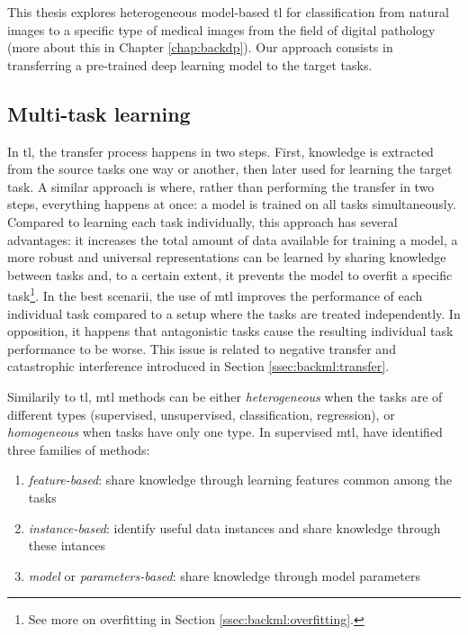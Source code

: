 This thesis explores heterogeneous model-based \acrlong{tl} for classification from natural images to a specific type of medical images from the field of digital pathology (more about this in Chapter \ref{chap:backdp}). Our approach consists in transferring a pre-trained deep learning model to the target tasks. 


\subsection{Multi-task learning}
\label{ssec:backml:mtl}

In \acrlong{tl}, the transfer process happens in two steps. First, knowledge is extracted from the source tasks one way or another, then later used for learning the target task. A similar approach is  where, rather than performing the transfer in two steps, everything happens at once: a model is trained on all tasks simultaneously. Compared to learning each task individually, this approach has several advantages: it increases the total amount of data available for training a model, a more robust and universal representations can be learned by sharing knowledge between tasks and, to a certain extent, it prevents the model to overfit a specific task\footnote{See more on overfitting in Section \ref{ssec:backml:overfitting}.}. In the best scenarii, the use of \acrlong{mtl} improves the performance of each individual task compared to a setup where the tasks are treated independently. In opposition, it happens that antagonistic tasks cause the resulting individual task performance to be worse. This issue is related to negative transfer and catastrophic interference introduced in Section \ref{ssec:backml:transfer}. 

Similarily to \acrlong{tl}, \acrlong{mtl} methods can be either \textit{heterogeneous} when the tasks are of different types (\eg supervised, unsupervised, classification, regression), or \textit{homogeneous} when tasks have only one type. In supervised \acrlong{mtl}, \parencite{zhang2017survey} have identified three families of methods:

\begin{enumerate}
  \item \textit{feature-based}: share knowledge through learning features common among the tasks
  \item \textit{instance-based}: identify useful data instances and share knowledge through these intances
  \item \textit{model} or \textit{parameters-based}: share knowledge through model parameters 
\end{enumerate}



